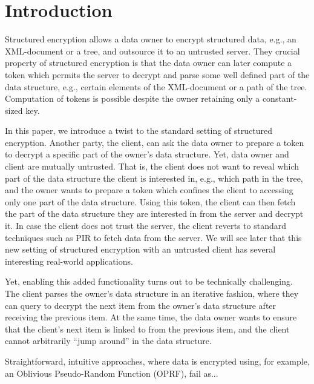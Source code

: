 \section{Introduction}
Structured encryption allows a data owner to encrypt structured data,
e.g., an XML-document or a tree, and outsource it to an untrusted
server.  They crucial property of structured encryption is that the
data owner can later compute a token which permits the server to
decrypt and parse some well defined part of the data structure, e.g.,
certain elements of the XML-document or a path of the
tree. Computation of tokens is possible despite the owner retaining
only a constant-sized key.

In this paper, we introduce a twist to the standard setting of
structured encryption. Another party, the client, can ask the data
owner to prepare a token to decrypt a specific part of the owner's
data structure. Yet, data owner and client are mutually
untrusted. That is, the client does not want to reveal which part of
the data structure the client is interested in, e.g., which path in
the tree, and the owner wants to prepare a token which confines the
client to accessing only one part of the data structure. Using this
token, the client can then fetch the part of the data structure they
are interested in from the server and decrypt it. In case the client
does not trust the server, the client reverts to standard techniques
such as PIR to fetch data from the server. We will see later that this
new setting of structured encryption with an untrusted client has
several interesting real-world applications.

Yet, enabling this added functionality turns out to be technically
challenging. The client parses the owner's data structure in an
iterative fashion, where they can query to decrypt the next item from
the owner's data structure after receiving the previous item. At the
same time, the data owner wants to ensure that the client's next item
is linked to from the previous item, and the client cannot arbitrarily
``jump around'' in the data structure.

Straightforward, intuitive approaches, where data
is encrypted using, for example, an Oblivious Pseudo-Random Function
(OPRF), fail as...
